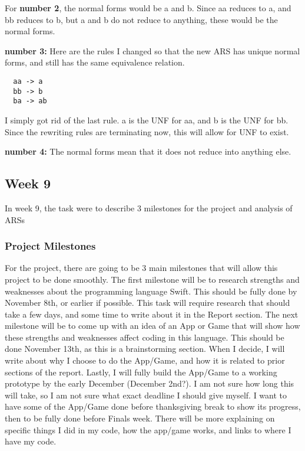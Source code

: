 \documentclass{article}
\theoremstyle{theorem}
\theoremstyle{definition}
\theoremstyle{remark}
\begin{document}
\noindent\newline\newline For \textbf{number 2}, the normal forms would be a and b. Since aa reduces to a, and bb reduces to b, but a and b do not reduce to anything, these would be the normal forms.

\noindent\newline\newline \textbf{number 3:} Here are the rules I changed so that the new ARS has unique normal forms, and still has the same equivalence relation.

\begin{verbatim}
  aa -> a
  bb -> b
  ba -> ab
\end{verbatim}

\noindent I simply got rid of the last rule. a is the UNF for aa, and b is the UNF for bb. Since the rewriting rules are terminating now, this will allow for UNF to exist.

\noindent\newline\newline \textbf{number 4:} The normal forms mean that it does not reduce into anything else. 

\subsection{Week 9} In week 9, the task were to describe 3 milestones for the project and analysis of ARSs

\subsubsection{Project Milestones} For the project, there are going to be 3 main milestones that will allow this project to be done smoothly. The first milestone will be to research strengths and weaknesses about the programming language Swift. This should be fully done by November 8th, or earlier if possible. This task will require research that should take a few days, and some time to write about it in the Report section. The next milestone will be to come up with an idea of an App or Game that will show how these strengths and weaknesses affect coding in this language. This should be done November 13th, as this is a brainstorming section. When I decide, I will write about why I choose to do the App/Game, and how it is related to prior sections of the report. Lastly, I will fully build the App/Game to a working prototype by the early December (December 2nd?). I am not sure how long this will take, so I am not sure what exact deadline I should give myself. I want to have some of the App/Game done before thanksgiving break to show its progress, then to be fully done before Finals week. There will be more explaining on specific things I did in my code, how the app/game works, and links to where I have my code.
\end{document}

